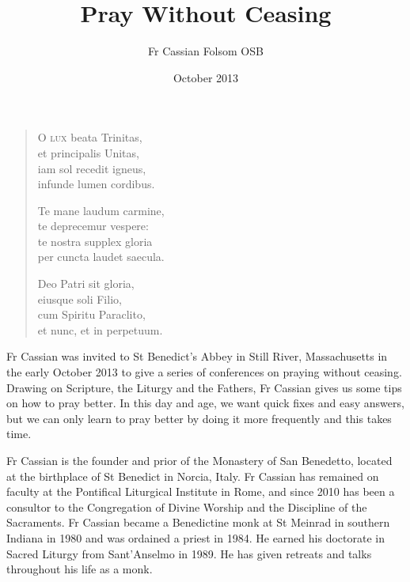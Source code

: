 \documentclass[10pt,a5paper]{book}
\title{Pray Without Ceasing}
\date{October 2013}
\author{Fr Cassian Folsom OSB}
\newenvironment{poem}
  {\begin{itshape}\begin{verse}
  }
  {\end{verse}\end{itshape}
  }
\begin{document}
\maketitle

\pagestyle{empty}

\begin{poem}
\textsc{O lux} beata Trinitas, \\
et principalis Unitas, \\
iam sol recedit igneus, \\
infunde lumen cordibus.

Te mane laudum carmine, \\
te deprecemur vespere: \\
te nostra supplex gloria \\
per cuncta laudet saecula.

Deo Patri sit gloria, \\
eiusque soli Filio, \\
cum Spiritu Paraclito, \\
et nunc, et in perpetuum.
\end{poem}

\newpage

Fr Cassian was invited to St Benedict's Abbey in Still River, Massachusetts in the early October 2013 to give a series of conferences on praying without ceasing. Drawing on Scripture, the Liturgy and the Fathers, Fr Cassian gives us some tips on how to pray better. In this day and age, we want quick fixes and easy answers, but we can only learn to pray better by doing it more frequently and this takes time.

Fr Cassian is the founder and prior of the Monastery of San Benedetto, located at the birthplace of St Benedict in Norcia, Italy. Fr Cassian has remained on faculty at the Pontifical Liturgical Institute in Rome, and since 2010 has been a consultor to the Congregation of Divine Worship and the Discipline of the Sacraments. Fr Cassian became a Benedictine monk at St Meinrad in southern Indiana in 1980 and was ordained a priest in 1984. He earned his doctorate in Sacred Liturgy from Sant'Anselmo in 1989. He has given retreats and talks throughout his life as a monk.




\end{document}
